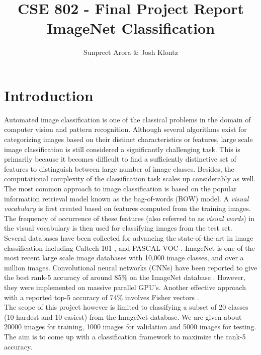 \documentclass[12pt]{article}
\begin{document}
\graphicspath{{images/}}
 
\title{CSE 802 - Final Project Report\\ ImageNet Classification}
\author{Sunpreet Arora \& Josh Klontz\\
}
 
\maketitle

\section{Introduction}
Automated image classification is one of the classical problems in the domain of computer vision and pattern recognition. Although several algorithms exist for categorizing images based on their distinct characteristics or features, large scale image classification is still considered a significantly challenging task. This is primarily because it becomes difficult to find a sufficiently distinctive set of features to distinguish between large number of image classes. Besides, the computational complexity of the classification task scales up considerably as well.\\
The most common approach to image classification is based on the popular information retrieval model known as the bag-of-words (BOW) model. A \textit{visual vocabulary} is first created based on features computed from the training images. The frequency of occurrence of these features (also referred to as \textit{visual words}) in the visual vocabulary is then used for classifying images from the test set.\\
Several databases have been collected for advancing the state-of-the-art in image classification including Caltech 101 \cite{caltech101}, and PASCAL VOC \cite{pascal09}. ImageNet \cite{imagenet} is one of the most recent large scale image databases with 10,000 image classes, and over a million images. Convolutional neural networks (CNNs) have been reported to give the best rank-5 accuracy of around 85\% on the ImageNet database \cite{alex2012}. However, they were implemented on massive parallel GPU's. Another effective approach with a reported top-5 accuracy of 74\% involves Fisher vectors \cite{csurka2011fisher}.\\
The scope of this project however is limited to classifying a subset of 20 classes (10 hardest and 10 easiest) from the ImageNet database. We are given about 20000 images for training, 1000 images for validation and 5000 images for testing. The aim is to come up with a classification framework to maximize the rank-5 accuracy.
\end{document}
